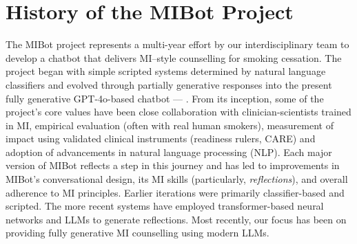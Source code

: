 \chapter{History of the MIBot Project}

\label{app:mibot_version_list}

\noindent The MIBot project represents a multi-year effort by our interdisciplinary team to develop a chatbot that delivers MI–style counselling for smoking cessation. The project began with simple scripted systems determined by natural language classifiers and evolved through partially generative responses into the present fully generative GPT-4o-based chatbot --- \sysnamewithv. From its inception, some of the project's core values have been close collaboration with clinician-scientists trained in MI, empirical evaluation (often with real human smokers), measurement of impact using validated clinical instruments (readiness rulers, CARE) and adoption of advancements in natural language processing (NLP). Each major version of MIBot reflects a step in this journey and has led to improvements in MIBot's conversational design, its MI skills (particularly, \textit{reflections}), and overall adherence to MI principles. Earlier iterations were primarily classifier-based and scripted. The more recent systems have employed transformer-based neural networks and LLMs to generate reflections. Most recently, our focus has been on providing fully generative MI counselling using modern LLMs.

